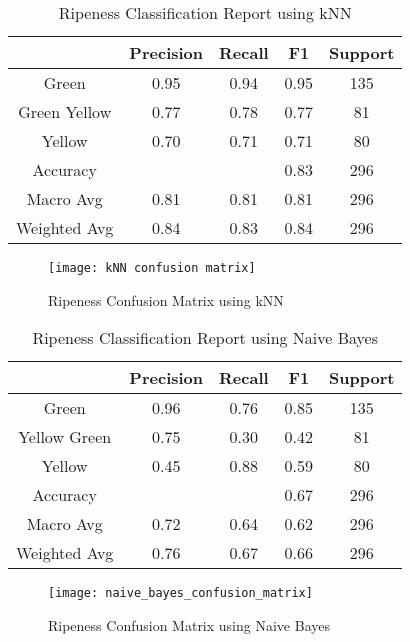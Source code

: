\begin{table}[htbp]
	\centering
	\begin{tabular}{c|c|c|c|c}
	  \hline
	  \textbf{ } & \textbf{Precision} & \textbf{Recall} & \textbf{F1} & \textbf{Support} \\
	  \hline
	  Green & 0.95 & 0.94 & 0.95 & 135 \\
	  \hline
	  Green Yellow & 0.77 & 0.78 & 0.77 & 81 \\
	  \hline
	  Yellow & 0.70 & 0.71 & 0.71 & 80 \\
	  \hline
	  Accuracy &  &  & 0.83 & 296 \\
	  \hline
	  Macro Avg & 0.81 & 0.81 & 0.81 & 296 \\
	  \hline
	  Weighted Avg & 0.84 & 0.83 & 0.84 & 296 \\
	  \hline
	\end{tabular}
	\caption{Ripeness Classification Report using kNN}
	\label{tab:bruises_classification_report_knn}
\end{table}

\begin{figure}[!htbp]
	\centering
	\texttt{[image: kNN confusion matrix]}
	\caption{Ripeness Confusion Matrix using kNN}
	\label{fig:ripeness_confusion_matrix_knn_fig}
\end{figure}

\begin{table}[htbp]
	\centering
	\begin{tabular}{c|c|c|c|c}
		\hline
		\textbf{ } & \textbf{Precision} & \textbf{Recall} & \textbf{F1} & \textbf{Support} \\
		\hline
		Green & 0.96 & 0.76 & 0.85 & 135 \\
		\hline
		Yellow Green & 0.75 & 0.30 & 0.42 & 81 \\
		\hline
		Yellow & 0.45 & 0.88 & 0.59 & 80 \\
		\hline
		Accuracy &  &  & 0.67 & 296 \\
		\hline
		Macro Avg & 0.72 & 0.64 & 0.62 & 296 \\
		\hline
		Weighted Avg & 0.76 & 0.67 & 0.66 & 296 \\
		\hline
	\end{tabular}
	\caption{Ripeness Classification Report using Naive Bayes}
	\label{tab:bruises_classification_report_naive_bayes}
\end{table}

\begin{figure}[!htbp]
	\centering
	\texttt{[image: naive\_bayes\_confusion\_matrix]}
	\caption{Ripeness Confusion Matrix using Naive Bayes}
	\label{fig:ripeness_confusion_matrix_nv_fig}
\end{figure}

